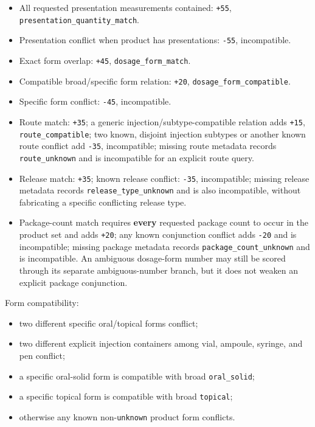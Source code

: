 \begin{itemize}
\tightlist
\item
  All requested presentation measurements contained: \texttt{+55}, \texttt{presentation\_\allowbreak{}quantity\_\allowbreak{}match}.
\item
  Presentation conflict when product has presentations: \texttt{-55}, incompatible.
\item
  Exact form overlap: \texttt{+45}, \texttt{dosage\_\allowbreak{}form\_\allowbreak{}match}.
\item
  Compatible broad/specific form relation: \texttt{+20}, \texttt{dosage\_\allowbreak{}form\_\allowbreak{}compatible}.
\item
  Specific form conflict: \texttt{-45}, incompatible.
\item
  Route match: \texttt{+35}; a generic injection/subtype-compatible relation adds \texttt{+15}, \texttt{route\_\allowbreak{}compatible}; two known, disjoint injection subtypes or another known route conflict add \texttt{-35}, incompatible; missing route metadata records \texttt{route\_\allowbreak{}unknown} and is incompatible for an explicit route query.
\item
  Release match: \texttt{+35}; known release conflict: \texttt{-35}, incompatible; missing release metadata records \texttt{release\_\allowbreak{}type\_\allowbreak{}unknown} and is also incompatible, without fabricating a specific conflicting release type.
\item
  Package-count match requires \textbf{every} requested package count to occur in the product set and adds \texttt{+20}; any known conjunction conflict adds \texttt{-20} and is incompatible; missing package metadata records \texttt{package\_\allowbreak{}count\_\allowbreak{}unknown} and is incompatible. An ambiguous dosage-form number may still be scored through its separate ambiguous-number branch, but it does not weaken an explicit package conjunction.
\end{itemize}

Form compatibility:

\begin{itemize}
\tightlist
\item
  two different specific oral/topical forms conflict;
\item
  two different explicit injection containers among vial, ampoule, syringe, and pen conflict;
\item
  a specific oral-solid form is compatible with broad \texttt{oral\_\allowbreak{}solid};
\item
  a specific topical form is compatible with broad \texttt{topical};
\item
  otherwise any known non-\texttt{unknown} product form conflicts.
\end{itemize}

